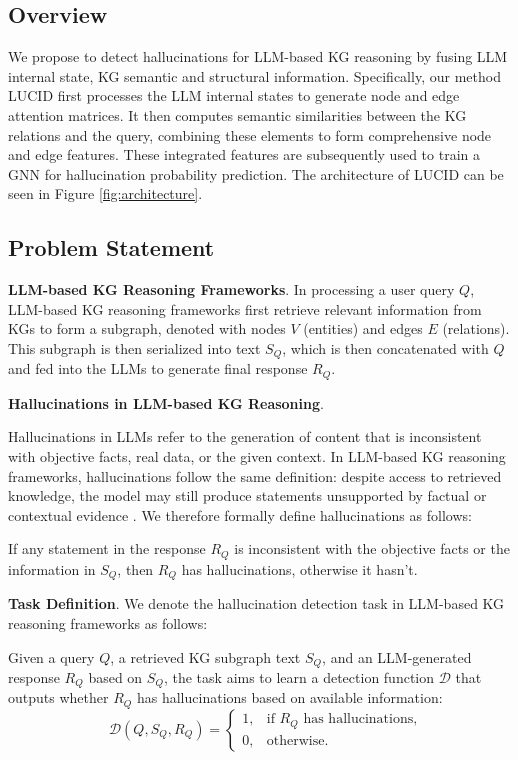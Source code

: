 \documentclass[11pt]{article}
\begin{document}
\subsection{Overview}

We propose to detect hallucinations for LLM-based KG reasoning by fusing LLM internal state, KG semantic and structural information. Specifically, our method LUCID first processes the LLM internal states to generate node and edge attention matrices. It then computes semantic similarities between the KG relations and the query, combining these elements to form comprehensive node and edge features. These integrated features are subsequently used to train a GNN for hallucination probability prediction. The architecture of LUCID can be seen in Figure \ref{fig:architecture}. 

\subsection{Problem Statement}

\textbf{LLM-based KG Reasoning Frameworks}. In processing a user query $Q$, LLM-based KG reasoning frameworks first retrieve relevant information from KGs to form a subgraph, denoted with nodes $V$ (entities) and edges $E$ (relations). This subgraph is then serialized into text $S_Q$, which is then concatenated with $Q$ and fed into the LLMs to generate final response $R_Q$.


\textbf{Hallucinations in LLM-based KG Reasoning}.

Hallucinations in LLMs \cite{huang2025survey} refer to the generation of content that is inconsistent with objective facts, real data, or the given context. In LLM-based KG reasoning frameworks, hallucinations follow the same definition: despite access to retrieved knowledge, the model may still produce statements unsupported by factual or contextual evidence \cite{wu2024ragtruth}. We therefore formally define hallucinations as follows:

If any statement in the response $R_Q$ is inconsistent with the objective facts or the information in $S_Q$, then $R_Q$ has hallucinations, otherwise it hasn't.


\textbf{Task Definition}.
We denote the hallucination detection task in LLM-based KG reasoning frameworks as follows:

Given a query \( Q \), a retrieved KG subgraph text $S_Q$, and an LLM-generated response \( R_Q \) based on \( S_Q \), the task aims to learn a detection function \( \mathcal{D} \) that outputs whether \( R_Q \) has hallucinations based on available information:
\[ 
\quad \mathcal{D}(Q, S_Q, R_Q) = 
\begin{cases}
1, & \text{if } R_Q \text{ has hallucinations} , \\
0, & \text{otherwise}.
\end{cases}
\]
\end{document}
